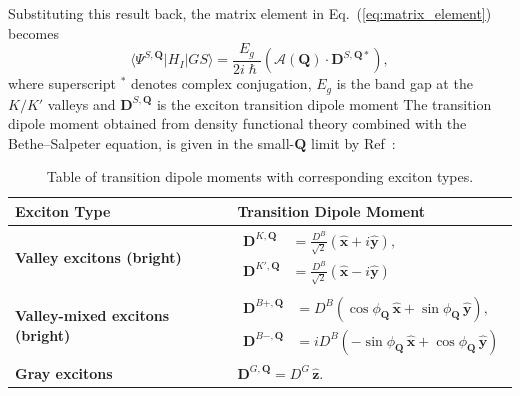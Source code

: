 Substituting this result back, the matrix element in Eq.~(\ref{eq:matrix_element})~\cite{peng2022tailoring, sanchez2024enhanced} becomes
\begin{equation}
\langle\Psi^{S, \boldsymbol{Q}}|H_I|GS\rangle 
=
\frac{E_g}{2i\hslash}
\left(
\boldsymbol{\mathcal{A}}(\boldsymbol{Q})  \cdot 
\boldsymbol{D}^{S, \boldsymbol{Q} *}
\right),
\label{firstmatrixelement}
\end{equation}
where superscript $^*$ denotes complex conjugation, $E_g$ is the band gap at the $K/K'$ valleys and $\boldsymbol{D}^{S, \boldsymbol{Q}}$ is the exciton transition dipole moment The transition dipole moment obtained from density functional theory combined with the Bethe--Salpeter equation, is given in the small-$\boldsymbol{Q}$ limit by Ref~\cite{peng2022tailoring, sanchez2024enhanced}:
\begin{table}[h]
\centering
\caption{Table of transition dipole moments with corresponding exciton types.} 
\label{tab:exciton_dipoles}
\renewcommand{\arraystretch}{1.5} %
\begin{tabular}{ll}
\hline\hline
\textbf{Exciton Type} & \textbf{Transition Dipole Moment} \\ \hline
\textbf{Valley excitons (bright)} & 
$\begin{aligned}
    \boldsymbol{D}^{K, \boldsymbol{Q}} &= \frac{D^B}{\sqrt{2}} (\hat{\boldsymbol{x}}+i\hat{\boldsymbol{y}}), \\
    \boldsymbol{D}^{K', \boldsymbol{Q}} &= \frac{D^B}{\sqrt{2}} (\hat{\boldsymbol{x}}-i\hat{\boldsymbol{y}})
\end{aligned}$ \\ \hline
\textbf{Valley-mixed excitons (bright)} & 
$\begin{aligned}
    \boldsymbol{D}^{B+, \boldsymbol{Q}} &= D^B\left(\cos\phi_{\boldsymbol{Q}}\,\hat{\boldsymbol{x}} + \sin\phi_{\boldsymbol{Q}}\,\hat{\boldsymbol{y}}\right), \\
    \boldsymbol{D}^{B-, \boldsymbol{Q}} &= iD^B \left(-\sin\phi_{\boldsymbol{Q}}\,\hat{\boldsymbol{x}} + \cos\phi_{\boldsymbol{Q}}\,\hat{\boldsymbol{y}}\right)
\end{aligned}$ \label{transitiondipole} \\ \hline
\textbf{Gray excitons} & 
$\boldsymbol{D}^{G, \boldsymbol{Q}} = D^G\,\hat{\boldsymbol{z}}.$ \\ \hline\hline
\end{tabular}
\end{table}

